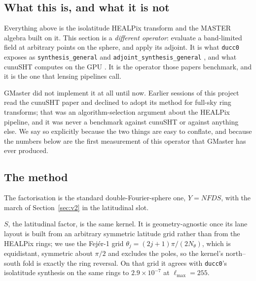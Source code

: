 \documentclass[usenatbib,useAMS]{mnras}
\begin{document}
\subsection{What this is, and what it is not}

Everything above is the isolatitude HEALPix transform and the MASTER algebra built on it. This section is a \emph{different operator}: evaluate a band-limited field at arbitrary points on the sphere, and apply its adjoint. It is what \texttt{ducc0} exposes as \texttt{synthesis\_general} and \texttt{adjoint\_synthesis\_general} \citep{reinecke2023}, and what cunuSHT computes on the GPU \citep{belkner2024}. It is the operator those papers benchmark, and it is the one that lensing pipelines call.

GMaster did not implement it at all until now. Earlier sessions of this project read the cunuSHT paper and declined to adopt its method for full-sky ring transforms; that was an algorithm-selection argument about the HEALPix pipeline, and it was never a benchmark against cunuSHT or against anything else. We say so explicitly because the two things are easy to conflate, and because the numbers below are the first measurement of this operator that GMaster has ever produced.

\subsection{The method}

The factorisation is the standard double-Fourier-sphere one, $Y=NFDS$, with the march of Section~\ref{sec:v2} in the latitudinal slot.

$S$, the latitudinal factor, is the same kernel. It is geometry-agnostic once its lane layout is built from an arbitrary symmetric latitude grid rather than from the HEALPix rings; we use the Fej\'er-1 grid $\theta_j=(2j+1)\pi/(2N_\theta)$, which is equidistant, symmetric about $\pi/2$ and excludes the poles, so the kernel's north--south fold is exactly the ring reversal. On that grid it agrees with \texttt{ducc0}'s isolatitude synthesis on the same rings to $2.9\times10^{-7}$ at $\ell_{\max}=255$.
\end{document}
